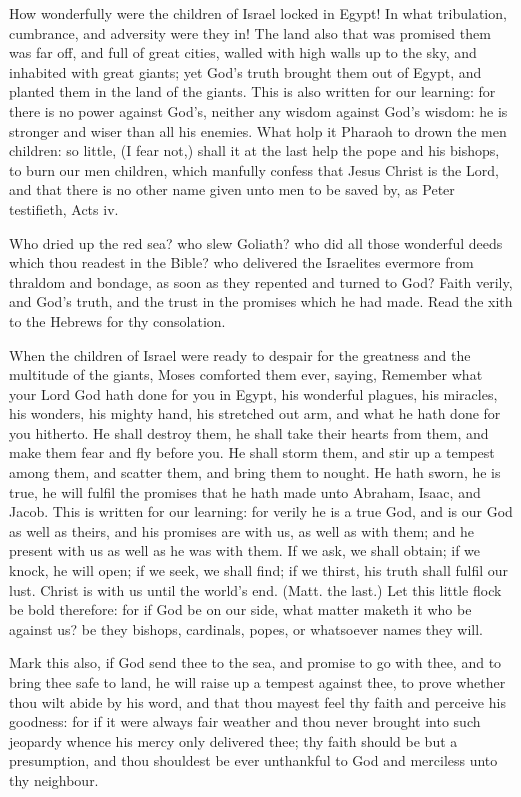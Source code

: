 How wonderfully were the children of Israel 
locked in Egypt! In what tribulation, cumbrance, 
and adversity were they in! The land also that 
was promised them was far off, and full of great 
cities, walled with high walls up to the sky, and 
inhabited with great giants; yet God's truth 
brought them out of Egypt, and planted them in 
the land of the giants. This is also written for 
our learning: for there is no power against God's,
neither any wisdom against God's wisdom: he is 
stronger and wiser than all his enemies. What 
holp it Pharaoh to drown the men children: so little,
(I fear not,) shall it at the last help the pope 
and his bishops, to burn our men children, 
which manfully confess that Jesus Christ is the 
Lord, and that there is no other name given unto 
men to be saved by, as Peter testifieth, Acts iv. 

Who dried up the red sea? who slew Goliath? 
who did all those wonderful deeds which thou 
readest in the Bible? who delivered the Israelites 
evermore from thraldom and bondage, as soon as 
they repented and turned to God? Faith verily, 
and God's truth, and the trust in the promises 
which he had made. Read the xith to the Hebrews
for thy consolation. 

When the children of Israel were ready to 
despair for the greatness and the multitude of the 
giants, Moses comforted them ever, saying, Remember
what your Lord God hath done for you 
in Egypt, his wonderful plagues, his miracles,
his wonders, his mighty hand, his stretched out 
arm, and what he hath done for you hitherto. He 
shall destroy them, he shall take their hearts 
from them, and make them fear and fly before 
you. He shall storm them, and stir up a tempest 
among them, and scatter them, and bring them to 
nought. He hath sworn, he is true, he will fulfil 
the promises that he hath made unto Abraham, 
Isaac, and Jacob. This is written for our learning: 
for verily he is a true God, and is our God as
well as theirs, and his promises are with us, as
well as with them; and he present with us as well 
as he was with them. If we ask, we shall obtain; 
if we knock, he will open; if we seek, we shall 
find; if we thirst, his truth shall fulfil our lust. 
Christ is with us until the world's end. (Matt. 
the last.) Let this little flock be bold therefore: 
for if God be on our side, what matter maketh 
it who be against us? be they bishops, cardinals, 
popes, or whatsoever names they will.



Mark this also, if God send thee to the sea, 
and promise to go with thee, and to bring 
thee safe to land, he will raise up a tempest 
against thee, to prove whether thou wilt abide 
by his word, and that thou mayest feel thy 
faith and perceive his goodness: for if it 
were always fair weather and thou never 
brought into such jeopardy whence his mercy 
only delivered thee; thy faith should be but 
a presumption, and thou shouldest be ever 
unthankful to God and merciless unto thy neighbour.

